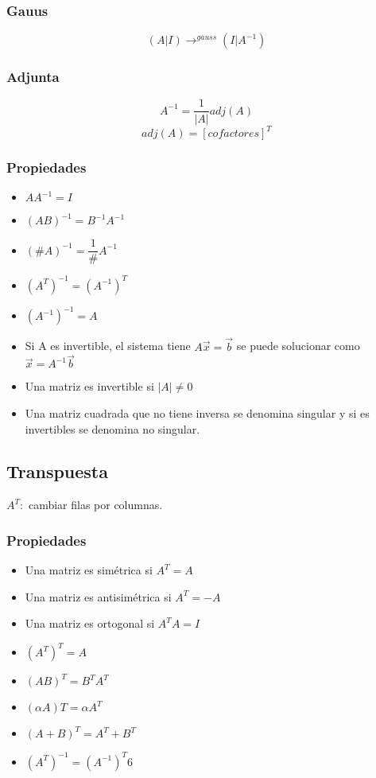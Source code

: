 \subsubsection{Gauus}
$$(A|I)\rightarrow^{gauss}(I|A^{-1})$$
\subsubsection{Adjunta}
$$A^{-1}=\dfrac{1}{|A|}adj(A)$$
$$adj(A)=[cofactores]^T$$

\subsubsection{Propiedades}
\begin{itemize}
	\item $AA^{-1}=I$
	\item $(AB)^{-1}=B^{-1}A^{-1}$
	\item $(\#A)^{-1}=\dfrac{1}{\#}A^{-1}$
	\item $(A^T)^{-1}=(A^{-1})^T$
	\item $(A^{-1})^{-1}=A$
	\item Si A es invertible, el sistema tiene $A\overrightarrow{x}=\overrightarrow{b}$ se puede solucionar como $\overrightarrow{x}=A^{-1}\overrightarrow{b}$
	\item Una matriz es invertible si $|A|\not=0$
	\item Una matriz cuadrada que no tiene inversa se denomina singular y si es invertibles se denomina no singular.
\end{itemize}

\subsection{Transpuesta}
$A^T:$ cambiar filas por columnas.
\subsubsection{Propiedades}
\begin{itemize}
	\item Una matriz es simétrica si $A^T=A$
	\item Una matriz es antisimétrica si $A^T=-A$
	\item Una matriz es ortogonal si $A^TA=I$
	\item $(A^T)^T=A$
	\item $(AB)^T=B^TA^T$
	\item $(\alpha A)T=\alpha A^T$
	\item $(A+B)^T=A^T+B^T$
	\item $(A^T)^{-1}=(A^{-1})^T6$
\end{itemize}

